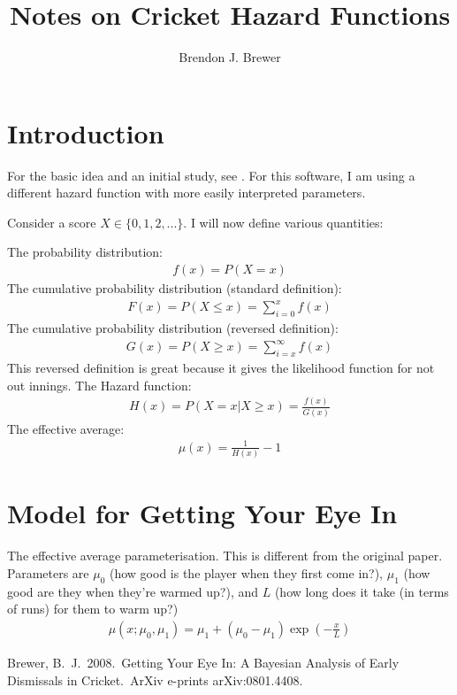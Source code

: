 \documentclass[letterpaper, 11pt]{article}
\title{Notes on Cricket Hazard Functions}
\author{Brendon J. Brewer}
\begin{document}
\maketitle

\section{Introduction}
For the basic idea and an initial study, see \citet{2008arXiv0801.4408B}.
For this software, I am using a different hazard function with more
easily interpreted parameters.

Consider a score $X \in \{0, 1, 2, ... \}$. I will now define various
quantities:

The probability distribution:
\begin{eqnarray}
f(x) = P(X = x)
\end{eqnarray}
The cumulative probability distribution (standard definition):
\begin{eqnarray}
F(x) = P(X \leq x) = \sum_{i=0}^x f(x)
\end{eqnarray}
The cumulative probability distribution (reversed definition):
\begin{eqnarray}
G(x) = P(X \geq x) = \sum_{i=x}^\infty f(x)
\end{eqnarray}
This reversed definition is great because it gives the likelihood function
for not out innings.
The Hazard function:
\begin{eqnarray}
H(x) = P(X = x | X \geq x) = \frac{f(x)}{G(x)}
\end{eqnarray}
The effective average:
\begin{eqnarray}
\mu(x) = \frac{1}{H(x)} - 1
\end{eqnarray}

\section{Model for Getting Your Eye In}
The effective average parameterisation. This is different from the original
paper. Parameters are $\mu_0$ (how good is the player when they first come
in?), $\mu_1$ (how good are they when they're warmed up?),
and $L$ (how long does it take (in terms of runs) for them to warm up?)
\begin{eqnarray}
\mu(x; \mu_0, \mu_1) = \mu_1 + \left(\mu_0 - \mu_1\right)\exp\left(-\frac{x}{L}\right)
\end{eqnarray}





\begin{thebibliography}{99}
 Brewer, B.~J.\ 2008.\ Getting 
Your Eye In: A Bayesian Analysis of Early Dismissals in Cricket.\ ArXiv 
e-prints arXiv:0801.4408.
\end{thebibliography}
\end{document}
